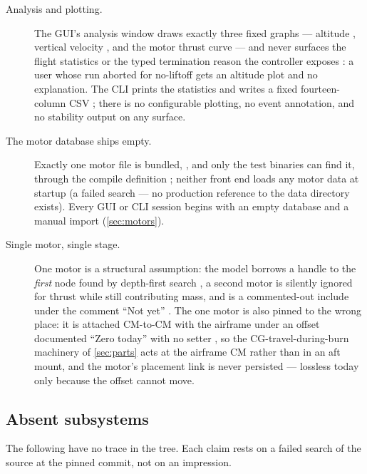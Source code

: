 \begin{description}
\item[Analysis and plotting.] The GUI's analysis window draws exactly three fixed graphs
--- altitude , vertical velocity
, and the motor thrust curve
 --- and never surfaces the flight statistics or the typed
termination reason the controller exposes : a user whose run aborted
for no-liftoff gets an altitude plot and no explanation. The CLI prints the statistics and
writes a fixed fourteen-column CSV ; there is no configurable
plotting, no event annotation, and no stability output on any surface.

\item[The motor database ships empty.] Exactly one motor file is bundled,
, and only the test binaries can find it, through the
 compile definition ; neither front
end loads any motor data at startup (a failed search --- no production reference to the
data directory exists). Every GUI or CLI session begins with an empty database and a manual
import (\cref{sec:motors}).

\item[Single motor, single stage.] One motor is a structural assumption: the model borrows
a handle to the \emph{first}  node found by depth-first search
, a second motor is silently ignored for thrust while still
contributing mass, and  is a commented-out include under the comment ``Not
yet'' . The one motor is also pinned to the wrong place: it is
attached CM-to-CM with the airframe under an offset documented ``Zero today'' with no
setter , so the CG-travel-during-burn machinery of
\cref{sec:parts} acts at the airframe CM rather than in an aft mount, and the motor's
placement link is never persisted  --- lossless today
only because the offset cannot move.

\end{description}

\subsection{Absent subsystems}\label{sec:incomplete-absent}

The following have no trace in the tree. Each claim rests on a failed search of the source
at the pinned commit, not on an impression.

